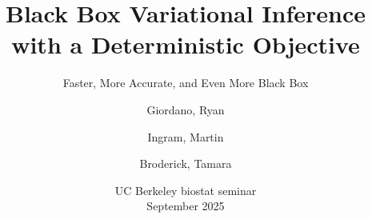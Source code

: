\documentclass[8pt]{beamer}\usepackage[]{graphicx}\usepackage[]{color}
\begin{document}

\title{Black Box Variational Inference\\\hspace{1em}with a Deterministic Objective}

\subtitle{Faster, More Accurate, and Even More Black Box} 
\date{UC Berkeley biostat seminar\\September 2025}

\author{Giordano, Ryan  \and Ingram, Martin \and Broderick, Tamara}



\frame{\titlepage}

\end{document}
